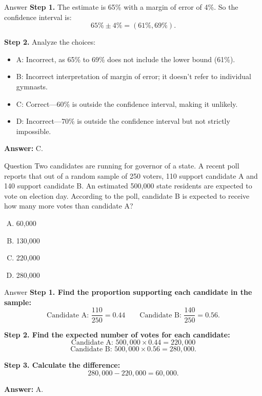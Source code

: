 \documentclass{beamer}
\begin{document}
\begin{frame}{Answer}
\textbf{Step 1.} The estimate is 65\% with a margin of error of 4\%. So the confidence interval is:
\[
65\% \pm 4\% = (61\%, 69\%).
\]

\textbf{Step 2.} Analyze the choices:
\begin{itemize}
    \item A: Incorrect, as 65\% to 69\% does not include the lower bound (61\%).
    \item B: Incorrect interpretation of margin of error; it doesn't refer to individual gymnasts.
    \item C: Correct—60\% is outside the confidence interval, making it unlikely.
    \item D: Incorrect—70\% is outside the confidence interval but not strictly impossible.
\end{itemize}

\textbf{Answer:} C.
\end{frame}



\begin{frame}{Question}
Two candidates are running for governor of a state. A recent poll reports that out of a random sample of 250 voters, 110 support candidate A and 140 support candidate B. An estimated 500{,}000 state residents are expected to vote on election day. According to the poll, candidate B is expected to receive how many more votes than candidate A?

\begin{enumerate}[A.]
    \item 60{,}000
    \item 130{,}000
    \item 220{,}000
    \item 280{,}000
\end{enumerate}
\end{frame}


\begin{frame}{Answer}
\textbf{Step 1. Find the proportion supporting each candidate in the sample:}
\[
\text{Candidate A: } \frac{110}{250} = 0.44 \quad \quad
\text{Candidate B: } \frac{140}{250} = 0.56.
\]

\textbf{Step 2. Find the expected number of votes for each candidate:}
\[
\text{Candidate A: } 500{,}000 \times 0.44 = 220{,}000
\]
\[
\text{Candidate B: } 500{,}000 \times 0.56 = 280{,}000.
\]

\textbf{Step 3. Calculate the difference:}
\[
280{,}000 - 220{,}000 = 60{,}000.
\]

\textbf{Answer:} A.
\end{frame}
\end{document}
